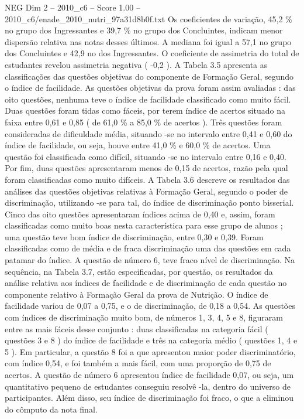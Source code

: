 \begin{textsample}{NEG Dim 2 – 2010\_c6 – Score 1.00 – 2010\_c6/enade\_2010\_nutri\_97a31d8b0f.txt}
Os coeficientes de variação, 45,2 \% no grupo dos Ingressantes e 39,7 \% no grupo dos Concluintes, indicam menor dispersão relativa nas notas desses últimos.
A mediana foi igual a 57,1 no grupo dos Concluintes e 42,9 no dos Ingressantes.
O coeficiente de assimetria do total de estudantes revelou assimetria negativa ( -0,2 ).
A Tabela 3.5 apresenta as classificações das questões objetivas do componente de Formação Geral, segundo o índice de facilidade.
As questões objetivas da prova foram assim avaliadas : das oito questões, nenhuma teve o índice de facilidade classificado como muito fácil.
Duas questões foram tidas como fáceis, por terem índice de acertos situado na faixa entre 0,61 e 0,85 ( de 61,0 \% a 85,0 \% de acertos ).
Três questões foram consideradas de dificuldade média, situando -se no intervalo entre 0,41 e 0,60 do índice de facilidade, ou seja, houve entre 41,0 \% e 60,0 \% de acertos.
Uma questão foi classificada como difícil, situando -se no intervalo entre 0,16 e 0,40.
Por fim, duas questões apresentaram menos de 0,15 de acertos, razão pela qual foram classificadas como muito difíceis.
A Tabela 3.6 descreve os resultados das análises das questões objetivas relativas à Formação Geral, segundo o poder de discriminação, utilizando -se para tal, do índice de discriminação ponto bisserial.
Cinco das oito questões apresentaram índices acima de 0,40 e, assim, foram classificadas como muito boas nesta característica para esse grupo de alunos ; uma questão teve bom índice de discriminação, entre 0,30 e 0,39.
Foram classificadas como de média e de fraca discriminação uma das questões em cada patamar do índice.
A questão de número 6, teve fraco nível de discriminação.
Na sequência, na Tabela 3.7, estão especificadas, por questão, os resultados da análise relativa aos índices de facilidade e de discriminação de cada questão no componente relativo à Formação Geral da prova de Nutrição.
O índice de facilidade variou de 0,07 a 0,75, e o de discriminação, de 0,18 a 0,54.
As questões com índices de discriminação muito bom, de números 1, 3, 4, 5 e 8, figuraram entre as mais fáceis desse conjunto : duas classificadas na categoria fácil ( questões 3 e 8 ) do índice de facilidade e três na categoria médio ( questões 1, 4 e 5 ).
Em particular, a questão 8 foi a que apresentou maior poder discriminatório, com índice 0,54, e foi também a mais fácil, com uma proporção de 0,75 de acertos.
A questão de número 6 apresentou índice de facilidade 0,07, ou seja, um quantitativo pequeno de estudantes conseguiu resolvê -la, dentro do universo de participantes.
Além disso, seu índice de discriminação foi fraco, o que a eliminou do cômputo da nota final.

\end{textsample}
